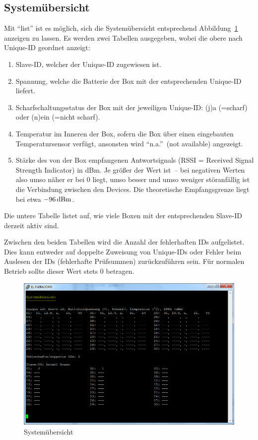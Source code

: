 \documentclass[pdftex, parskip, numbers=noenddot, toc=listof]{scrbook}
\begin{document}
	\subsection{Systemübersicht}
	\label{sec:list}

	Mit \enquote{list} ist es möglich, sich die Systemübersicht entsprechend Abbildung~\ref{fig:list} anzeigen zu lassen. Es werden zwei Tabellen ausgegeben, wobei die obere nach Unique-ID geordnet anzeigt:
	\begin{enumerate}
		\item Slave-ID, welcher der Unique-ID zugewiesen ist.
		\item Spannung, welche die Batterie der Box mit der entsprechenden Unique-ID liefert.
		\item Scharfschaltungsstatus der Box mit der jeweiligen Unique-ID: (j)a (=scharf) oder (n)ein (=nicht scharf).
		\item Temperatur im Inneren der Box, sofern die Box über einen eingebauten Temperatursensor verfügt, ansonsten wird \enquote{n.a.}~(not available) angezeigt.
		\item Stärke des von der Box empfangenen Antwortsignals (RSSI = Received Signal Strength Indicator) in dBm. Je größer der Wert ist~-- bei negativen Werten also umso näher er bei 0 liegt, umso besser und umso weniger störanfällig ist die Verbindung zwischen den Devices. Die theoretische Empfangsgrenze liegt bei etwa $\unit[-96]{dBm}$.
	\end{enumerate}

	Die untere Tabelle listet auf, wie viele Boxen mit der entsprechenden Slave-ID derzeit aktiv sind.

	Zwischen den beiden Tabellen wird die Anzahl der fehlerhaften IDs aufgelistet. Dies kann entweder auf doppelte Zuweisung von Unique-IDs oder Fehler beim Auslesen der IDs (fehlerhafte Prüfsummen) zurückzuführen sein. Für normalen Betrieb sollte dieser Wert stets 0 betragen.

	\begin{figure}
		\centering
		\includegraphics[width=.8\textwidth]{Bilder/list}
		\caption{Systemübersicht}
		\label{fig:list}
	\end{figure}
\end{document}
